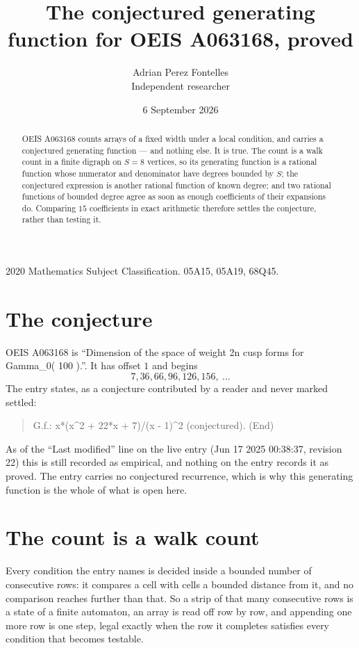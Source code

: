 \documentclass[11pt,a4paper]{article}
\title{The conjectured generating function for OEIS A063168, proved}
\author{Adrian Perez Fontelles\\ \small Independent researcher}
\date{6 September 2026}
\theoremstyle{plain}
\theoremstyle{definition}
\begin{document}
\maketitle

\begin{abstract}
OEIS A063168 counts arrays of a fixed width under a local condition, and carries a conjectured
generating function --- and nothing else. It is true. The count is a walk count in a finite
digraph on $S=8$ vertices, so its generating function is a rational function whose numerator
and denominator have degrees bounded by $S$; the conjectured expression is another rational
function of known degree; and two rational functions of bounded degree agree as soon as enough
coefficients of their expansions do. Comparing $15$ coefficients in exact arithmetic
therefore settles the conjecture, rather than testing it.
\end{abstract}

\noindent\small 2020 Mathematics Subject Classification. 05A15, 05A19, 68Q45.\normalsize

\section{The conjecture}

OEIS A063168 is ``Dimension of the space of weight 2n cusp forms for Gamma\_0( 100 ).''. It has offset $1$ and begins
\[
7, 36, 66, 96, 126, 156,\ \dots
\]
The entry states, as a conjecture contributed by a reader and never marked settled:
\begin{quote}
G.f.: x*(x\^{}2 + 22*x + 7)/(x - 1)\^{}2 (conjectured). (End)
\end{quote}
As of the ``Last modified'' line on the live entry (Jun 17 2025 00:38:37, revision 22) this is still
recorded as empirical, and nothing on the entry records it as proved. The entry carries no
conjectured recurrence, which is why this generating function is the whole of what is open
here.

\section{The count is a walk count}

Every condition the entry names is decided inside a bounded number of consecutive rows: it
compares a cell with cells a bounded distance from it, and no comparison reaches further than
that. So a strip of that many consecutive rows is a state of a finite automaton, an array is
read off row by row, and appending one more row is one step, legal exactly when the row it
completes satisfies every condition that becomes testable.
\end{document}
